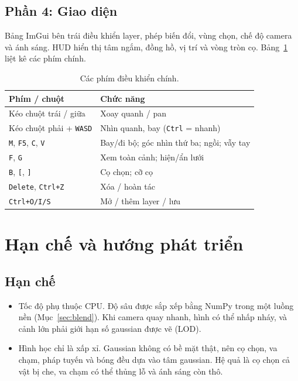 \documentclass[9pt,twocolumn,a4paper]{extarticle}
\newcommand{\code}[1]{\texttt{#1}}
\begin{document}
\subsection{Phần 4: Giao diện}
Bảng ImGui bên trái điều khiển layer, phép biến đổi, vùng chọn, chế độ camera và ánh sáng. HUD hiển thị tâm ngắm, đồng hồ, vị trí và vòng tròn cọ. Bảng~\ref{tab:keys} liệt kê các phím chính.
\begin{table}[H]
\centering
\caption{Các phím điều khiển chính.}
\label{tab:keys}
\footnotesize
\begin{tabular}{@{}p{3.1cm}p{4.6cm}@{}}
\toprule
Phím / chuột & Chức năng \\
\midrule
Kéo chuột trái / giữa & Xoay quanh / pan \\
Kéo chuột phải + \code{WASD} & Nhìn quanh, bay (\code{Ctrl} = nhanh) \\
\code{M}, \code{F5}, \code{C}, \code{V} & Bay/đi bộ; góc nhìn thứ ba; ngồi; vẫy tay \\
\code{F}, \code{G} & Xem toàn cảnh; hiện/ẩn lưới \\
\code{B}, \code{[}, \code{]} & Cọ chọn; cỡ cọ \\
\code{Delete}, \code{Ctrl+Z} & Xóa / hoàn tác \\
\code{Ctrl+O/I/S} & Mở / thêm layer / lưu \\
\bottomrule
\end{tabular}
\end{table}

\section{Hạn chế và hướng phát triển}
\label{chap:future}
\subsection{Hạn chế}
\begin{itemize}\itemsep0pt
\item Tốc độ phụ thuộc CPU. Độ sâu được sắp xếp bằng NumPy trong một luồng nền (Mục~\ref{sec:blend}). Khi camera quay nhanh, hình có thể nhấp nháy, và cảnh lớn phải giới hạn số gaussian được vẽ (LOD).
\item Hình học chỉ là xấp xỉ. Gaussian không có bề mặt thật, nên cọ chọn, va chạm, pháp tuyến và bóng đều dựa vào tâm gaussian. Hệ quả là cọ chọn cả vật bị che, va chạm có thể thủng lỗ và ánh sáng còn thô.
\end{itemize}
\end{document}
